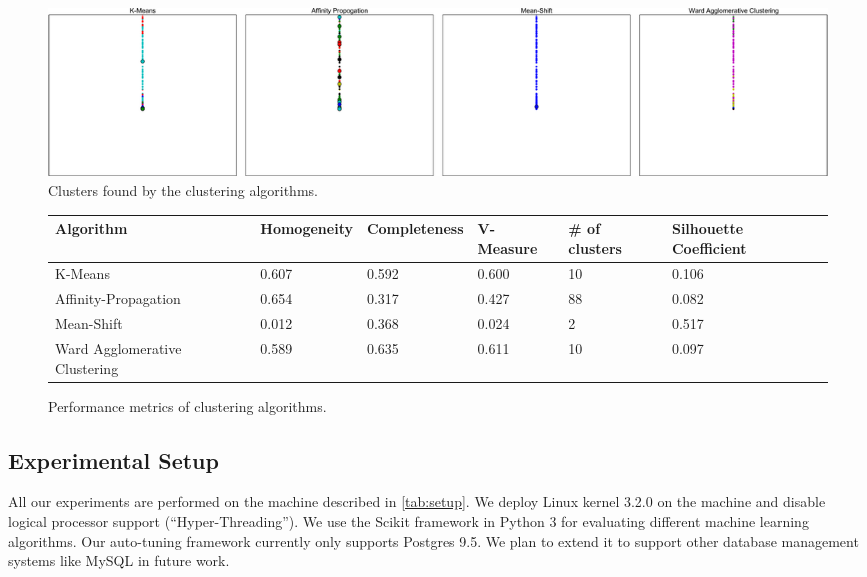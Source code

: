 \begin{figure}
    \centering
    \includegraphics[width=\textwidth]{figure/clustering.pdf}
    \caption{Clusters found by the clustering algorithms.}
    \label{fig:clusters}
\end{figure}

\begin{figure}
    \centering
    \begin{adjustbox}{max width=\textwidth}    
    \begin{tabular}{llllll}
      \toprule
      Algorithm                     & Homogeneity & Completeness & V-Measure &
      \# of clusters & Silhouette Coefficient \\
      \midrule
      K-Means                       & 0.607       & 0.592        & 0.600   & 10
      & 0.106  \\
      Affinity-Propagation          & 0.654       & 0.317        & 0.427   & 88 
      & 0.082  \\
      Mean-Shift                    & 0.012       & 0.368        & 0.024   & 2
      & 0.517 \\
      Ward Agglomerative Clustering & 0.589       & 0.635        & 0.611   & 10 
      & 0.097 \\
      \bottomrule
    \end{tabular}
    \end{adjustbox}
    \caption{Performance metrics of clustering algorithms.}
    \label{fig:clustering-metrics}
\end{figure}

\subsection{Experimental Setup}
\label{sec:setup}

All our experiments are performed on the machine described in \cref{tab:setup}.
We deploy Linux kernel 3.2.0 on the machine and disable logical processor
support (“Hyper-Threading”).
We use the Scikit \citep{scikit-learn} framework in Python 3 for
evaluating different machine learning algorithms.
Our auto-tuning framework currently only supports Postgres 9.5. We plan to
extend it to support other database management systems like MySQL in future
work.

